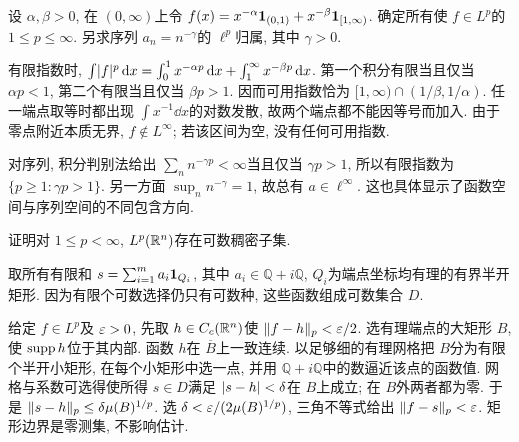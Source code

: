 \begin{exercise}\label{ra:c5:ex-powers}
设 $\alpha,\beta>0$, 在 $(0,\infty)$上令 $f(x)=x^{-\alpha}\mathbf 1_{(0,1)}+x^{-\beta}\mathbf 1_{[1,\infty)}$. 确定所有使 $f\in L^p$的 $1\le p\le\infty$. 另求序列 $a_n=n^{-\gamma}$的 $\ell^p$归属, 其中 $\gamma>0$.
\end{exercise}
\begin{solution}
有限指数时, $\int\lvert f\rvert^p\,\mathrm d x=\int_0^1x^{-\alpha p}\,\mathrm d x+\int_1^\infty x^{-\beta p}\,\mathrm d x$. 第一个积分有限当且仅当 $\alpha p<1$, 第二个有限当且仅当 $\beta p>1$. 因而可用指数恰为 $[1,\infty)\cap(1/\beta,1/\alpha)$. 任一端点取等时都出现 $\int x^{-1}\dd x$的对数发散, 故两个端点都不能因等号而加入. 由于零点附近本质无界, $f\notin L^\infty$; 若该区间为空, 没有任何可用指数.

对序列, 积分判别法给出 $\sum_nn^{-\gamma p}<\infty$当且仅当 $\gamma p>1$, 所以有限指数为 $\{p\ge1:\gamma p>1\}$. 另一方面 $\sup_nn^{-\gamma}=1$, 故总有 $a\in\ell^\infty$. 这也具体显示了函数空间与序列空间的不同包含方向.
\end{solution}

\begin{exercise}\label{ra:c5:ex-separable}
证明对 $1\le p<\infty$, $L^p(\mathbb R^n)$存在可数稠密子集.
\end{exercise}
\begin{solution}
取所有有限和 $s=\sum_{i=1}^m a_i\mathbf 1_{Q_i}$, 其中 $a_i\in\mathbb Q+i\mathbb Q$, $Q_i$为端点坐标均有理的有界半开矩形. 因为有限个可数选择仍只有可数种, 这些函数组成可数集合 $D$.

给定 $f\in L^p$及 $\varepsilon>0$, 先取 $h\in C_c(\mathbb R^n)$使 $\lVert f-h\rVert_p<\varepsilon/2$. 选有理端点的大矩形 $B$, 使 $\operatorname{supp} h$位于其内部. 函数 $h$在 $\overline B$上一致连续. 以足够细的有理网格把 $B$分为有限个半开小矩形, 在每个小矩形中选一点, 并用 $\mathbb Q+i\mathbb Q$中的数逼近该点的函数值. 网格与系数可选得使所得 $s\in D$满足 $\lvert s-h\rvert<\delta$在 $B$上成立; 在 $B$外两者都为零. 于是 $\lVert s-h\rVert_p\le\delta\mu(B)^{1/p}$. 选 $\delta<\varepsilon/(2\mu(B)^{1/p})$, 三角不等式给出 $\lVert f-s\rVert_p<\varepsilon$. 矩形边界是零测集, 不影响估计.
\end{solution}
